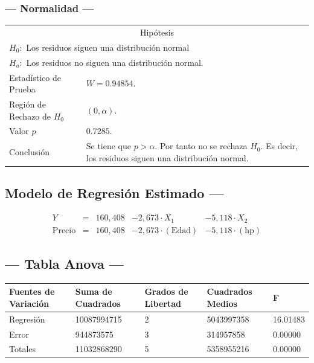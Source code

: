 \subsubsection{--- Normalidad ---} %
\begin{center}
  \begin{tabular}{|l|p{8cm}|}
    \cline{1-2}
    \multicolumn{2}{|c|}{Hipótesis}\\ \cline{1-2}
    \multicolumn{2}{|l|}{\(H_0:\) Los residuos siguen una distribución normal} \\ 
    \multicolumn{2}{|l|}{\(H_a:\) Los residuos no siguen una distribución normal.} \\ \cline{1-2}
    Estadístico de Prueba & \(W = 0.94854\).\\ \cline{1-2} 
		Región de Rechazo de \(H_0\) & \((0, \alpha )\).\\ \cline{1-2} 
    Valor \(p\) & \(0.7285\).\\ \cline{1-2} 
    Conclusión & Se tiene que \(p> \alpha\). \newline 
		Por tanto no se rechaza \(H_0\). \newline 
		Es decir, los residuos siguen una distribución normal.\\ \cline{1-2} 
  \end{tabular}
\end{center}


\subsection{\centering Modelo de Regresión Estimado ---} %
\begin{align}
	Y & = &              160,408 & - 2,673 \cdot X_1           & - 5,118     \cdot X_2   \\[2mm]
	\mbox{Precio} & = &  160,408 & - 2,673 \cdot (\mbox{Edad}) & - 5,118     \cdot (\mbox{hp})
	\label{eq:4}
\end{align}

\subsection{\centering --- Tabla Anova ---} %
\begin{center}
  \begin{tabular}{|l|l|l|l|l|}
    \hline 
    Fuentes de Variación  & Suma de Cuadrados & Grados de Libertad & Cuadrados Medios & F\\ \hline 
Regresión  &  10087994715          &  2       & 5043997358 & 16.01483\\ \hline
Error      &    944873575          &  3       &  314957858 &  0.00000\\ \hline
Totales    &  11032868290          &  5       & 5358955216 &  0.00000\\ \hline
  \end{tabular}
\end{center} 

